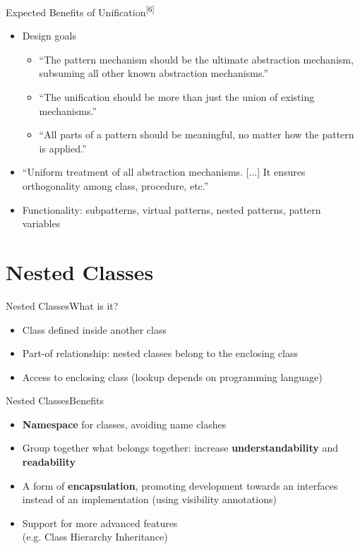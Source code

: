 \documentclass[xcolor=dvipsname, handout]{beamer} %
\begin{document}
\begin{frame}{Expected Benefits of Unification\textsuperscript{[6]}}
\begin{itemize}
  \item Design goals \begin{itemize}
    \item ``The pattern mechanism should be the ultimate abstraction mechanism, subsuming all other known abstraction mechanisms.'' 
    \item ``The unification should be more than just the union of existing mechanisms.''
    \item ``All parts of a pattern should be meaningful, no matter how the pattern is applied.''
  \end{itemize}
  \item ``Uniform treatment of all abstraction mechanisms. [...] It ensures orthogonality among class, procedure, etc.''
  \item Functionality: subpatterns, virtual patterns, nested patterns, pattern variables
\end{itemize}
\end{frame}

\section{Nested Classes}

\begin{frame}{Nested Classes}{What is it?}
\begin{itemize}
  \item Class defined inside another class
  \item Part-of relationship: nested classes belong to the enclosing class
  \item Access to enclosing class (lookup depends on programming language)
\end{itemize}
\end{frame}

\begin{frame}{Nested Classes}{Benefits}
\begin{itemize}
  \item \textbf{Namespace} for classes, avoiding name clashes
  \item Group together what belongs together: increase \textbf{understandability} and \textbf{readability}
  \item A form of \textbf{encapsulation}, promoting development towards an interfaces instead of an implementation (using visibility annotations)
  \item Support for more advanced features \\ (e.g. Class Hierarchy Inheritance)
\end{itemize}
\end{frame}
\end{document}
